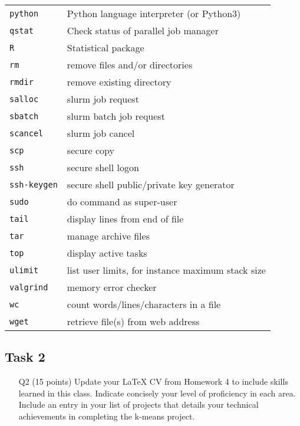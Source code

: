 \begin{table}
\begin{tabular}{@{\makebox[3em][r]{\rownumber\space}}|l|l}
       \texttt{python} & Python language interpreter (or Python3) \\
        \texttt{qstat} & Check status of parallel job manager \\
        \texttt{R} & Statistical package \\
        \texttt{rm} & remove files and/or directories \\
        \texttt{rmdir} & remove existing directory \\
        \texttt{salloc} & slurm job request\\
        \texttt{sbatch} & slurm batch job request\\
        \texttt{scancel} & slurm job cancel\\
        \texttt{scp} & secure copy \\
        \texttt{ssh} & secure shell logon\\
        \texttt{ssh-keygen} & secure shell public/private key generator \\
        \texttt{sudo} & do command as super-user\\
        \texttt{tail} & display lines from end of file \\
        \texttt{tar} & manage archive files \\
        \texttt{top} & display active tasks \\
        \texttt{ulimit} & list user limits, for instance maximum stack size \\
        \texttt{valgrind} & memory error checker\\
        \texttt{wc} & count words/lines/characters in a file \\
        \texttt{wget} & retrieve file(s) from web address \\
    \hline 
    \end{tabular}
\end{table}

\newpage
\subsection*{Task 2}
\begin{itemize}
\item [Q2] (15 points) Update your \LaTeX{} CV from Homework 4 to include skills learned in this class. Indicate concisely your level of proficiency in each area. Include an entry in your list of projects that details your technical achievements in completing the k-means project.
\end{itemize}


